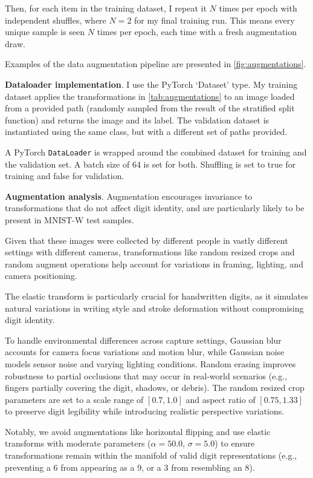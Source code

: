 \documentclass[11pt]{article}
\begin{document}
Then, for each item in the training dataset, I repeat it $N$ times per epoch with independent shuffles, where $N = 2$ for my final training run. This means every unique sample is seen $N$ times per epoch, each time with a fresh augmentation draw.


Examples of the data augmentation pipeline are presented in \autoref{fig:augmentations}.

\textbf{Dataloader implementation}. I use the PyTorch `Dataset' type. My training dataset applies the transformations in \autoref{tab:augmentations} to an image loaded from a provided path (randomly sampled from the result of the stratified split function) and returns the image and its label. The validation dataset is instantiated using the same class, but with a different set of paths provided.

A PyTorch \texttt{DataLoader} is wrapped around the combined dataset for training and the validation set. A batch size of 64 is set for both. Shuffling is set to true for training and false for validation.


\textbf{Augmentation analysis}. Augmentation encourages invariance to transformations that do not affect digit identity, and are particularly likely to be present in MNIST-W test samples. 

Given that these images were collected by different people in vastly different settings with different cameras, transformations like random resized crops and random augment operations help account for variations in framing, lighting, and camera positioning. 

The elastic transform is particularly crucial for handwritten digits, as it simulates natural variations in writing style and stroke deformation without compromising digit identity. 

To handle environmental differences across capture settings, Gaussian blur accounts for camera focus variations and motion blur, while Gaussian noise models sensor noise and varying lighting conditions. Random erasing improves robustness to partial occlusions that may occur in real-world scenarios (e.g., fingers partially covering the digit, shadows, or debris). The random resized crop parameters are set to a scale range of $[0.7, 1.0]$ and aspect ratio of $[0.75, 1.33]$ to preserve digit legibility while introducing realistic perspective variations. 

Notably, we avoid augmentations like horizontal flipping and use elastic transforms with moderate parameters ($\alpha = 50.0$, $\sigma = 5.0$) to ensure transformations remain within the manifold of valid digit representations (e.g., preventing a 6 from appearing as a 9, or a 3 from resembling an 8).
\end{document}

